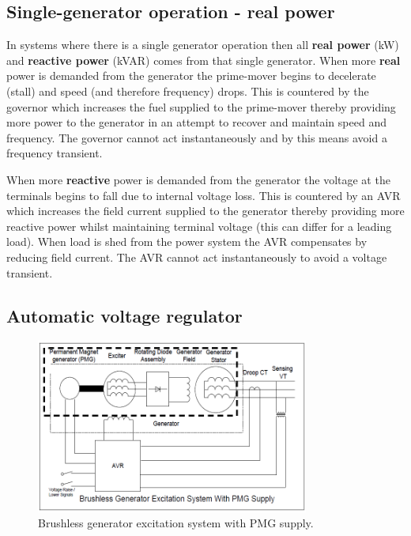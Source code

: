 \subsection{Single-generator operation - real power}
In systems where there is a single generator operation then all \textbf{real power} (\si{\kilo\watt}) and \textbf{reactive power} (\si{kVAR}) comes from that single generator. When more \textbf{real} power is demanded from the generator the prime-mover begins to decelerate (stall) and speed (and therefore frequency) drops. This is countered by the governor which increases the fuel supplied to the prime-mover thereby providing more power to the generator in an attempt to recover and maintain speed and frequency. The governor cannot act instantaneously and by this means avoid a frequency transient.

When more \textbf{reactive} power is demanded from the generator the voltage at the terminals begins to fall due to internal voltage loss. This is countered by an AVR which increases the field current supplied to the generator thereby providing more reactive power whilst maintaining terminal voltage (this can differ for a leading load). When load is shed from the power system the AVR compensates by reducing field current. The AVR cannot act instantaneously to avoid a voltage transient.
\subsection{Automatic voltage regulator}
\begin{figure}[H]
    \centering
    \includegraphics[width = 0.8\textwidth]{img/figure79.png}
    \caption{Brushless generator excitation system with PMG supply.}
\end{figure}
